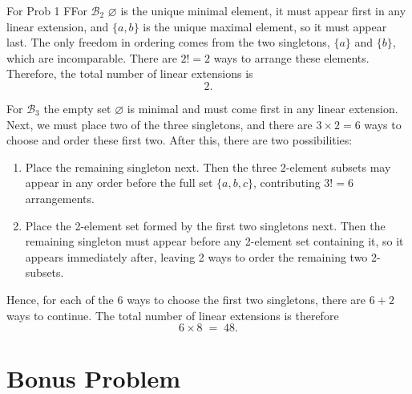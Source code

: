 \documentclass{report}
\begin{document}
\begin{RemarkWithLily}{For Prob 1}
  FFor $\mathcal{B}_2$ $\varnothing$ is the unique minimal element, it must appear first in any linear extension, and $\{a,b\}$ is the unique maximal element, so it must appear last. The only freedom in ordering comes from the two singletons, $\{a\}$ and $\{b\}$, which are incomparable. There are $2! = 2$ ways to arrange these elements. Therefore, the total number of linear extensions is 
  \[
  2.
  \]

  \medskip

  For $\mathcal{B}_3$ the empty set $\varnothing$ is minimal and must come first in any linear extension.  
  Next, we must place two of the three singletons, and there are $3\times 2=6$ ways to choose and order these first two.  
  After this, there are two possibilities:
  \begin{enumerate}
  \item Place the remaining singleton next. Then the three 2-element subsets may appear in any order before the full set $\{a,b,c\}$, contributing $3!=6$ arrangements.
  \item Place the 2-element set formed by the first two singletons next. Then the remaining singleton must appear before any 2-element set containing it, so it appears immediately after, leaving 2 ways to order the remaining two 2-subsets.
  \end{enumerate}
  Hence, for each of the $6$ ways to choose the first two singletons, there are $6 + 2$ ways to continue.  The total number of linear extensions is therefore
  \[
  6 \times 8 \;=\; 48.
  \]
\end{RemarkWithLily}


\newpage 



\section*{Bonus Problem}

\end{document}
